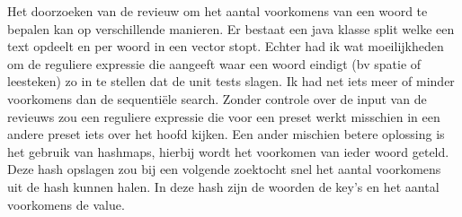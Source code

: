 \documentclass[]{article}
\begin{document}
Het doorzoeken van de revieuw om het aantal voorkomens van een woord te bepalen kan op verschillende manieren.
Er bestaat een java klasse split welke een text opdeelt en per woord in een vector stopt. Echter had ik wat moeilijkheden om de reguliere expressie die aangeeft waar een woord eindigt (bv spatie of leesteken) zo in te stellen dat de unit tests slagen. Ik had net iets meer of minder voorkomens dan de sequentiële search. Zonder controle over de input van de revieuws zou een reguliere expressie die voor een preset werkt misschien in een andere preset iets over het hoofd kijken. Een ander mischien betere oplossing is het gebruik van hashmaps, hierbij wordt het voorkomen van ieder woord geteld. Deze hash opslagen zou bij een volgende zoektocht snel het aantal voorkomens uit de hash kunnen halen. In deze hash zijn de woorden de key's en het aantal voorkomens de value.
\end{document}

